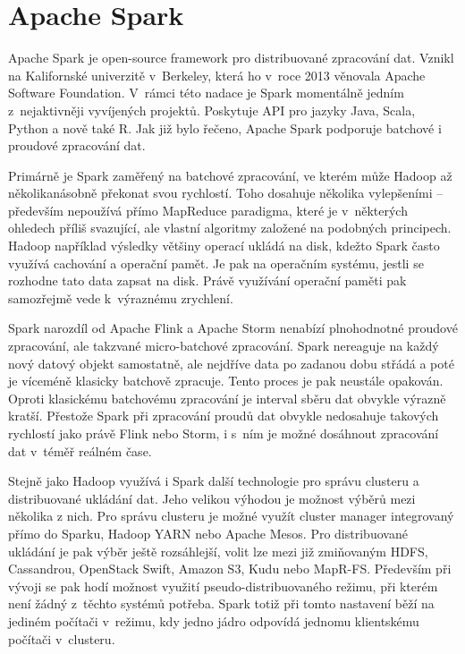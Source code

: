 \documentclass[thesis=B,czech]{FITthesis}[2012/06/26]
\begin{document}
	
\section{Apache Spark}
	Apache Spark je open-source framework pro distribuované zpracování dat. Vznikl na Kalifornské univerzitě v~Berkeley, která ho v~roce 2013 věnovala Apache Software Foundation. V~rámci této nadace je Spark momentálně jedním z~nejaktivněji vyvíjených projektů\cite{spark-toplevel}. Poskytuje API pro jazyky Java, Scala, Python a nově také R. Jak již bylo řečeno, Apache Spark podporuje batchové i proudové zpracování dat. 
	
	Primárně je Spark zaměřený na batchové zpracování, ve kterém může Hadoop až několikanásobně překonat svou rychlostí. Toho dosahuje několika vylepšeními -- především nepoužívá přímo MapReduce paradigma, které je v~některých ohledech příliš svazující, ale vlastní algoritmy založené na podobných principech. Hadoop například výsledky většiny operací ukládá na disk, kdežto Spark často využívá cachování a operační pamět. Je pak na operačním systému, jestli se rozhodne tato data zapsat na disk\cite{spark-mapreduce-difference}. Právě využívání operační paměti pak samozřejmě vede k~výraznému zrychlení. 
		
	Spark narozdíl od Apache Flink a Apache Storm nenabízí plnohodnotné proudové zpracování, ale takzvané micro-batchové zpracování. Spark nereaguje na každý nový datový objekt samostatně, ale nejdříve data po zadanou dobu střádá a poté je víceméně klasicky batchově zpracuje. Tento proces je pak neustále opakován. Oproti klasickému batchovému zpracování je interval sběru dat obvykle výrazně kratší.  Přestože Spark při zpracování proudů dat obvykle nedosahuje takových rychlostí jako právě Flink nebo Storm, i s~ním je možné dosáhnout zpracování dat v~téměř reálném čase\cite{streaming-benchmark}. 

	Stejně jako Hadoop využívá i Spark další technologie pro správu clusteru a distribuované ukládání dat. Jeho velikou výhodou je možnost výběrů mezi několika z nich. Pro správu clusteru je možné využít cluster manager integrovaný přímo do Sparku, Hadoop YARN nebo Apache Mesos. Pro distribuované ukládání je pak výběr ještě rozsáhlejší, volit lze mezi již zmiňovaným HDFS, Cassandrou, OpenStack Swift, Amazon S3, Kudu nebo MapR-FS. Především při vývoji se pak hodí možnost využití pseudo-distribuovaného režimu, při kterém není žádný z~těchto systémů potřeba. Spark totiž při tomto nastavení běží na jediném počítači v~režimu, kdy jedno jádro odpovídá jednomu klientskému počítači v~clusteru. 
\end{document}

